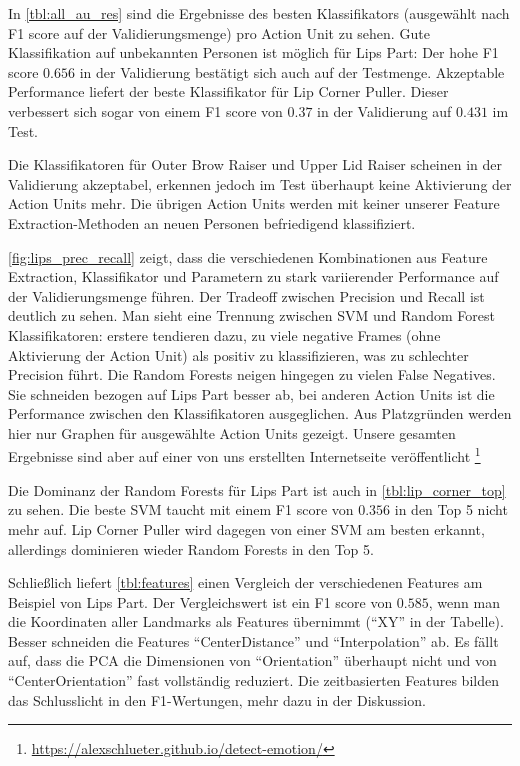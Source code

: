 In \cref{tbl:all_au_res} sind die Ergebnisse des besten Klassifikators
(ausgewählt nach F1 score auf der Validierungsmenge) pro Action Unit zu sehen.
Gute Klassifikation auf unbekannten Personen ist möglich für Lips Part: Der hohe
F1 score $0.656$ in der Validierung bestätigt sich auch auf der Testmenge. Akzeptable
Performance liefert der beste Klassifikator für Lip Corner Puller. Dieser
verbessert sich sogar von einem F1 score von $0.37$ in der Validierung auf
$0.431$ im Test.

Die Klassifikatoren für Outer Brow Raiser und Upper Lid Raiser scheinen in der
Validierung akzeptabel, erkennen jedoch im Test überhaupt keine Aktivierung der
Action Units mehr. Die übrigen Action Units werden mit keiner unserer Feature
Extraction-Methoden an neuen Personen befriedigend klassifiziert.

\cref{fig:lips_prec_recall} zeigt, dass die verschiedenen Kombinationen aus
Feature Extraction, Klassifikator und Parametern zu stark variierender
Performance auf der Validierungsmenge führen. Der Tradeoff zwischen Precision
und Recall ist deutlich zu sehen. Man sieht eine Trennung zwischen SVM und
Random Forest Klassifikatoren: erstere tendieren dazu, zu viele negative Frames
(ohne Aktivierung der Action Unit) als positiv zu klassifizieren, was zu
schlechter Precision führt. Die Random Forests neigen hingegen zu vielen False
Negatives. Sie schneiden bezogen auf Lips Part besser ab, bei anderen Action
Units ist die Performance zwischen den Klassifikatoren ausgeglichen.
Aus Platzgründen werden hier nur Graphen für ausgewählte Action Units gezeigt.
Unsere gesamten Ergebnisse sind aber auf einer von uns
erstellten Internetseite veröffentlicht
\footnote{\url{https://alexschlueter.github.io/detect-emotion/}}



Die Dominanz der Random Forests für Lips Part ist auch in
\cref{tbl:lip_corner_top} zu sehen. Die beste SVM taucht mit einem F1 score von
$0.356$ in den Top 5 nicht mehr auf. Lip Corner Puller wird dagegen von einer
SVM am besten erkannt, allerdings dominieren wieder Random Forests in den Top 5.


Schließlich liefert \cref{tbl:features} einen Vergleich der verschiedenen
Features am Beispiel von Lips Part. Der Vergleichswert ist ein F1 score von
$0.585$, wenn man die Koordinaten aller Landmarks als Features übernimmt (``XY''
in der Tabelle). Besser schneiden die Features ``CenterDistance'' und
``Interpolation'' ab. Es fällt auf, dass die PCA die Dimensionen von
``Orientation'' überhaupt nicht und von ``CenterOrientation'' fast vollständig reduziert. Die zeitbasierten Features bilden das Schlusslicht in den
F1-Wertungen, mehr dazu in der Diskussion.

